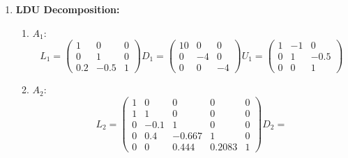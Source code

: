 \documentclass[conference,onecolumn]{IEEEtran}
\begin{document}
\begin{enumerate}[label=\arabic{enumi}.]
          \begin{enumerate}
              \item \textbf{LDU Decomposition:}
                    \begin{enumerate}
                        \item $A_1$:
                              $$
                                  L_1 =
                                  \begin{pmatrix}
                                      1   & 0    & 0 \\
                                      0   & 1    & 0 \\
                                      0.2 & -0.5 & 1
                                  \end{pmatrix}
                                  D_1 =
                                  \begin{pmatrix}
                                      10 & 0  & 0  \\
                                      0  & -4 & 0  \\
                                      0  & 0  & -4
                                  \end{pmatrix}
                                  U_1 =
                                  \begin{pmatrix}
                                      1 & -1 & 0    \\
                                      0 & 1  & -0.5 \\
                                      0 & 0  & 1
                                  \end{pmatrix}
                              $$
                        \item $A_2$:
                              $$
                                  L_2 =
                                  \begin{pmatrix}
                                      1 & 0    & 0      & 0      & 0 \\
                                      1 & 1    & 0      & 0      & 0 \\
                                      0 & -0.1 & 1      & 0      & 0 \\
                                      0 & 0.4  & -0.667 & 1      & 0 \\
                                      0 & 0    & 0.444  & 0.2083 & 1
                                  \end{pmatrix}
                                  D_2 =
$$
\end{enumerate}
\end{enumerate}
\end{enumerate}
\end{document}
